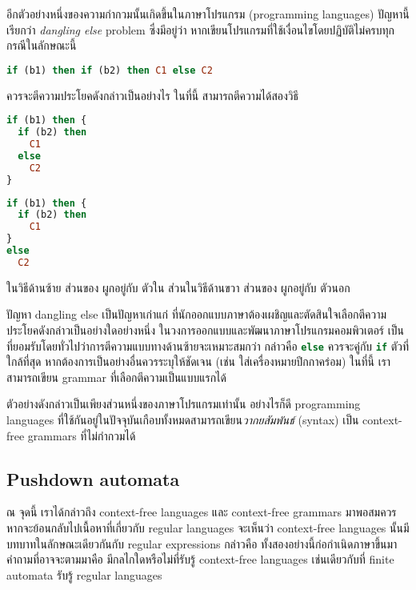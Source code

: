\begin{example}
อีกตัวอย่างหนึ่งของความกำกวมนั้นเกิดขึ้นในภาษาโปรแกรม (programming languages) \enskip ปัญหานี้เรียกว่า \emph{dangling else} problem ซึ่งมีอยู่ว่า หากเขียนโปรแกรมที่ใช้เงื่อนไขโดยปฏิบัติไม่ครบทุกกรณีในลักษณะนี้
\begin{lstlisting}[language=haskell]
if (b1) then if (b2) then C1 else C2
\end{lstlisting}
ควรจะตีความประโยคดังกล่าวเป็นอย่างไร \enskip ในที่นี้ สามารถตีความได้สองวิธี
\begin{multicols}{2}
\begin{lstlisting}[language=haskell]
if (b1) then {
  if (b2) then
    C1
  else
    C2
}
\end{lstlisting}

\begin{lstlisting}[language=haskell]
if (b1) then {
  if (b2) then
    C1
}
else
  C2
\end{lstlisting}
\end{multicols}
ในวิธีด้านซ้าย ส่วนของ  ผูกอยู่กับ  ตัวใน ส่วนในวิธีด้านขวา ส่วนของ  ผูกอยู่กับ  ตัวนอก

ปัญหา dangling else เป็นปัญหาเก่าแก่ ที่นักออกแบบภาษาต้องเผชิญและตัดสินใจเลือกตีความประโยคดังกล่าวเป็นอย่างใดอย่างหนึ่ง \enskip ในวงการออกแบบและพัฒนาภาษาโปรแกรมคอมพิวเตอร์ เป็นที่ยอมรับโดยทั่วไปว่าการตีความแบบทางด้านซ้ายจะเหมาะสมกว่า กล่าวคือ \lstinline[language=java]{else} ควรจะคู่กับ \lstinline[language=java]{if} ตัวที่ใกล้ที่สุด หากต้องการเป็นอย่างอื่นควรระบุให้ชัดเจน (เช่น ใส่เครื่องหมายปีกกาคร่อม) \enskip ในที่นี้ เราสามารถเขียน grammar ที่เลือกตีความเป็นแบบแรกได้
\end{example}

ตัวอย่างดังกล่าวเป็นเพียงส่วนหนึ่งของภาษาโปรแกรมเท่านั้น อย่างไรก็ดี programming languages ที่ใช้กันอยู่ในปัจจุบันเกือบทั้งหมดสามารถเขียน\emph{วากยสัมพันธ์} (syntax) เป็น context-free grammars ที่ไม่กำกวมได้

\subsection{Pushdown automata}

ณ จุดนี้ เราได้กล่าวถึง context-free languages และ context-free grammars มาพอสมควร \enskip หากจะย้อนกลับไปเนื้อหาที่เกี่ยวกับ regular languages จะเห็นว่า context-free languages นั้นมีบทบาทในลักษณะเดียวกันกับ regular expressions กล่าวคือ ทั้งสองอย่างนี้ก่อกำเนิดภาษาขึ้นมา \enskip คำถามที่อาจจะตามมาคือ มีกลไกใดหรือไม่ที่รับรู้ context-free languages เช่นเดียวกับที่ finite automata รับรู้ regular languages

